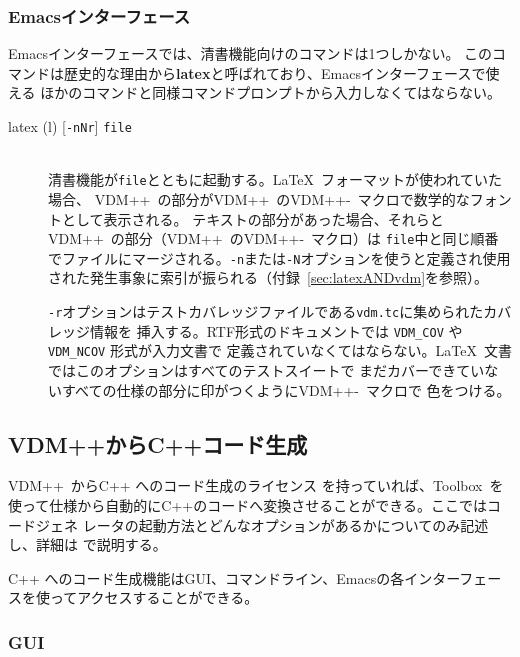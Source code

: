 \documentclass[\pformat,12pt]{jarticle}
\newcommand{\vdmslpp}{VDM++}
\newcommand{\Toolbox}{Toolbox}
\DeclareRobustCommand{\VdmSlPp}{VDM++-\VdmSl}
\begin{document}
\subsubsection{Emacsインターフェース}

Emacsインターフェースでは、清書機能向けのコマンドは1つしかない。
このコマンドは歴史的な理由から\textbf{latex}と呼ばれており、Emacsインターフェースで使える
ほかのコマンドと同様コマンドプロンプトから入力しなくてはならない。

\begin{description} 


\item[latex (l) \mbox{[{\tt -nNr}]} {\tt file}] \mbox{}\\
  清書機能が{\tt file}とともに起動する。\LaTeX\ フォーマットが使われていた場合、
  \vdmslpp\ の部分が\vdmslpp\ の\VdmSlPp\ マクロで数学的なフォントとして表示される。
  テキストの部分があった場合、それらと\vdmslpp\ の部分（\vdmslpp\ の\VdmSlPp\ マクロ）は
  {\tt file}中と同じ順番でファイルにマージされる。{\tt -n}または{\tt -N}オプションを使うと定義され使用
  された発生事象に索引が振られる（付録~\ref{sec:latexANDvdm}を参照）。
  
{\tt -r}オプションはテストカバレッジファイルである{\tt vdm.tc}に集められたカバレッジ情報を
挿入する。RTF形式のドキュメントでは {\tt VDM\_COV} や{\tt VDM\_NCOV} 形式が入力文書で
定義されていなくてはならない。\LaTeX\ 文書ではこのオプションはすべてのテストスイートで
まだカバーできていないすべての仕様の部分に印がつくように\VdmSlPp\ マクロで
色をつける。

\end{description}


\newpage

\subsection{VDM++からC++コード生成}\label{sec:cg}


\vdmslpp\  からC++ へのコード生成のライセンス を持っていれば、\Toolbox\ を
使って仕様から自動的にC++のコードへ変換させることができる。ここではコードジェネ
レータの起動方法とどんなオプションがあるかについてのみ記述し、詳細は%
で説明する。

C++ へのコード生成機能はGUI、コマンドライン、Emacsの各インターフェースを使ってアクセスすることができる。

\subsubsection{GUI}
\end{document}
